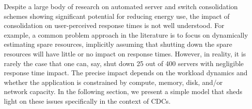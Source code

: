 Despite a large body of research on automated server and switch consolidation schemes showing significant potential for reducing energy use, the impact of consolidation on user-perceived response times is not well understood. 
For example, a common problem approach in the literature \cite{mathew12, Jain} is to focus on dynamically estimating spare resources, implicitly assuming that shutting down the spare resources will have little or no impact on response times. However, in reality, it is rarely the case that one can, say, shut down 25 out of 400 servers with negligible response time impact. The precise impact depends on the workload dynamics and whether the application is constrained by compute, memory, disk, and/or network capacity. In the following section, we present a simple model that sheds light on these issues specifically in the context of CDCs.




%



